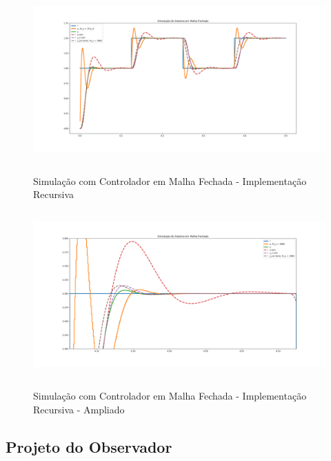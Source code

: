 \documentclass[
	12pt,				%
	article,			%
	openright,			%
	oneside,
	a4paper,			%
	chapter=TITLE,		%
	section=TITLE,		%
	english,			%
	french,				%
	spanish,			%
	brazil,				%
]{abntex2}
\begin{document}
            	\begin{figure}[htbp]
                	\centering
                	\caption{Simulação com Controlador em Malha Fechada - Implementação Recursiva}
                	\includegraphics[width=\textwidth,height=240px,keepaspectratio]{imgs/step_response_recursive_closedloop.png}
                	\label{fig-step_response_recursive_closedloop}
            	\end{figure}
            	
            	\begin{figure}[htbp]
                	\centering
                	\caption{Simulação com Controlador em Malha Fechada - Implementação Recursiva - Ampliado}
                	\includegraphics[width=\textwidth,height=240px,keepaspectratio]{imgs/step_response_recursive_closedloop_zoom.png}
                	\label{fig-step_response_recursive_closedloop_zoom}
            	\end{figure}
                
            \subsection{Projeto do Observador}
            
\end{document}
